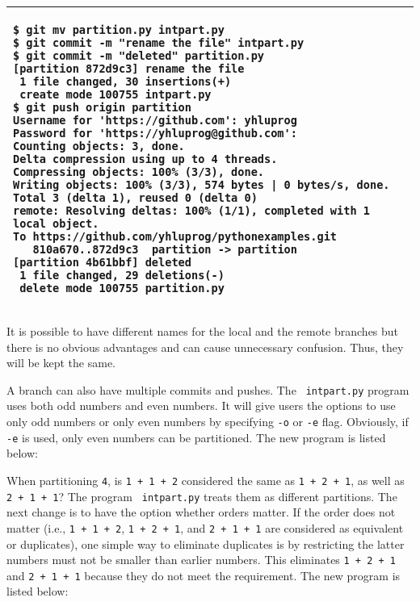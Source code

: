 
\clearpage
\vspace{0.2in}
\noindent
\begin{tabular}{|p{5.5in}|}\hline
\begin{verbatim}
$ git mv partition.py intpart.py
$ git commit -m "rename the file" intpart.py 
$ git commit -m "deleted" partition.py
[partition 872d9c3] rename the file
 1 file changed, 30 insertions(+)
 create mode 100755 intpart.py
$ git push origin partition
Username for 'https://github.com': yhluprog
Password for 'https://yhluprog@github.com': 
Counting objects: 3, done.
Delta compression using up to 4 threads.
Compressing objects: 100% (3/3), done.
Writing objects: 100% (3/3), 574 bytes | 0 bytes/s, done.
Total 3 (delta 1), reused 0 (delta 0)
remote: Resolving deltas: 100% (1/1), completed with 1 local object.
To https://github.com/yhluprog/pythonexamples.git
   810a670..872d9c3  partition -> partition
[partition 4b61bbf] deleted
 1 file changed, 29 deletions(-)
 delete mode 100755 partition.py
\end{verbatim}
\\ \hline
\end{tabular}
\vspace{0.2in}


It is possible to have different names for the local and the remote
branches but there is no obvious advantages and can cause unnecessary
confusion.  Thus, they will be kept the same.

A branch can also have multiple commits and pushes. The {\tt
  intpart.py} program uses both odd numbers and even numbers. It will
give users the options to use only odd numbers or only even numbers by
specifying {\tt -o} or {\tt -e} flag. Obviously, if {\tt -e} is used,
only even numbers can be partitioned. The new program is listed below:

\resetlinenumber[1]
\linenumbers
\begin{tt}
  
\end{tt}
\nolinenumbers

When partitioning {\tt 4}, is {\tt 1 + 1 + 2} considered the same as
{\tt 1 + 2 + 1}, as well as {\tt 2 + 1 + 1}? The program {\tt
  intpart.py} treats them as different partitions.  The next change is
to have the option whether orders matter. If the order does not matter
(i.e., {\tt 1 + 1 + 2}, {\tt 1 + 2 + 1}, and {\tt 2 + 1 + 1} are
considered as equivalent or duplicates), one simple way to eliminate
duplicates is by restricting the latter numbers must not be smaller
than earlier numbers.  This eliminates {\tt 1 + 2 + 1} and {\tt 2 + 1
  + 1} because they do not meet the requirement.
The new program is listed below:

